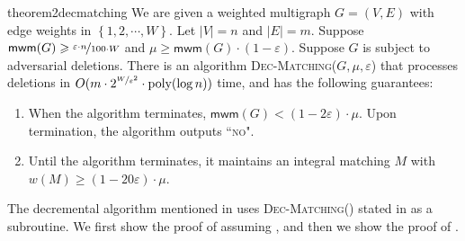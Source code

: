 \documentclass[a4paper,11pt]{article}
\newcommand{\card}[1]{|#1|}
\newcommand{\set}[1]{\ensuremath{\left\{ #1 \right\}}}
\newcommand{\poly}{\mbox{\rm poly}}
\newcommand{\eps}{\varepsilon}
\theoremstyle{definition}
\theoremstyle{definition}
\theoremstyle{definition}
\theoremstyle{definition}
\theoremstyle{definition}
\theoremstyle{definition}
\theoremstyle{definition}
\theoremstyle{definition}
\theoremstyle{definition}
\theoremstyle{definition}
\theoremstyle{definition}
\theoremstyle{definition}
\theoremstyle{definition}
\theoremstyle{definition}
\theoremstyle{definition}
\begin{document}
\begin{restatable}{theorem2}{decmatching}\label{thm:main2}
We are given a weighted multigraph $G=(V,E)$ with edge weights in $\set{1,2,\cdots, W}$. Let $\card{V}=n$ and $\card{E}=m$. Suppose $\textsf{mwm}(G)\geqslant \nicefrac{\varepsilon\cdot n}{100\cdot W}$ and $\mu\geqslant \textsf{mwm}(G)\cdot (1-\varepsilon)$. Suppose $G$ is subject to adversarial deletions. There is an algorithm \textsc{Dec-Matching}($G,\mu, \varepsilon$) that processes deletions in $O(m\cdot 2^{\nicefrac{W}{\eps^2}}\cdot \poly(\log n))$ time, and has the following guarantees:
\begin{enumerate}
\item When the algorithm terminates, $\textsf{mwm}(G)< (1-2\varepsilon)\cdot \mu$. Upon termination, the algorithm outputs ``\textsc{no}". \label{item:main2a}
\item Until the algorithm terminates, it maintains an integral matching $M$ with $w(M)\geqslant (1-20\varepsilon)\cdot \mu$. \label{item:main2b}
\end{enumerate}
\end{restatable}
The decremental algorithm mentioned in  uses \textsc{Dec-Matching}() stated in  as a subroutine. We first show the proof of  assuming , and then we show the proof of .
\end{document}
